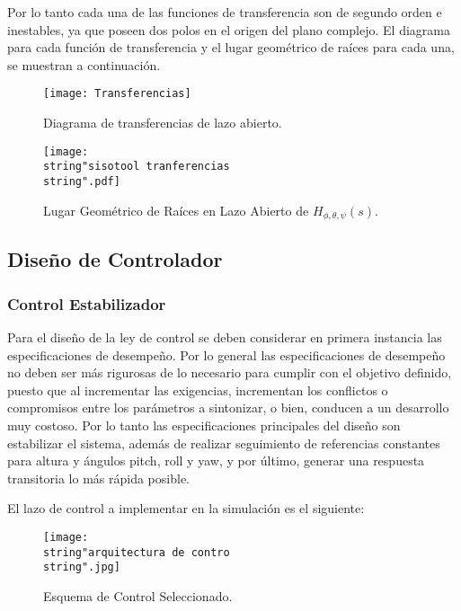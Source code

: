 \documentclass[\main/main.tex]{subfiles}
\begin{document}
Por lo tanto cada una de las funciones de transferencia son de segundo
orden e inestables, ya que poseen dos polos en el origen del plano
complejo. El diagrama para cada función de transferencia y el lugar
geométrico de raíces para cada una, se muestran a continuación.

\begin{figure}[H]
\noindent \begin{centering}
\texttt{[image: Transferencias]}
\par\end{centering}
\caption{Diagrama de transferencias de lazo abierto.}
\end{figure}

\begin{figure}[H]
\noindent \begin{centering}
\texttt{[image: \\string"sisotool tranferencias\\string".pdf]}
\par\end{centering}
\caption{Lugar Geométrico de Raíces en Lazo Abierto de $H_{\phi,\theta,\psi}(s)$.}
\end{figure}

\subsection{Diseño de Controlador}

\subsubsection{Control Estabilizador}

Para el diseño de la ley de control se deben considerar en primera
instancia las especificaciones de desempeño. Por lo general las especificaciones
de desempeño no deben ser más rigurosas de lo necesario para cumplir
con el objetivo definido, puesto que al incrementar las exigencias,
incrementan los conflictos o compromisos entre los parámetros a sintonizar,
o bien, conducen a un desarrollo muy costoso. Por lo tanto las especificaciones
principales del diseño son estabilizar el sistema, además de realizar
seguimiento de referencias constantes para altura y ángulos pitch,
roll y yaw, y por último, generar una respuesta transitoria lo más
rápida posible. 

El lazo de control a implementar en la simulación es el siguiente:

\begin{figure}[H]
\noindent \begin{centering}
\texttt{[image: \\string"arquitectura de contro\\string".jpg]}
\par\end{centering}
\caption{\label{fig:Esquema-de-Com}Esquema de Control Seleccionado.}
\end{figure}
\end{document}
